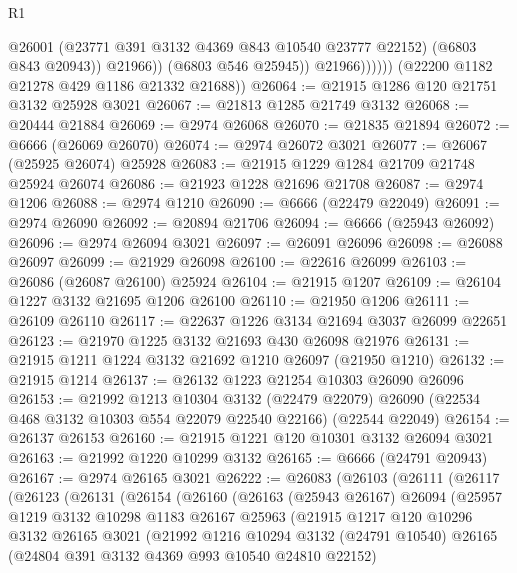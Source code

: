 \begin{lexlean}{R1}
\begin{coremodule}
                          @26001
                          (@23771 @391 @3132 @4369 @843 @10540 @23777 @22152)
                          (@6803 @843 @20943))
                        @21966))
                    (@6803 @546 @25945))
                  @21966))))))
      (@22200 @1182 @21278 @429 @1186 @21332 @21688))
@26064 := @21915 @1286 @120 @21751 @3132 @25928 @3021
@26067 := @21813 @1285 @21749 @3132
@26068 := @20444 @21884
@26069 := @2974 @26068
@26070 := @21835 @21894
@26072 := @6666 (@26069 @26070)
@26074 := @2974 @26072 @3021
@26077 := @26067 (@25925 @26074) @25928
@26083 := @21915 @1229 @1284 @21709 @21748 @25924 @26074
@26086 := @21923 @1228 @21696 @21708
@26087 := @2974 @1206
@26088 := @2974 @1210
@26090 := @6666 (@22479 @22049)
@26091 := @2974 @26090
@26092 := @20894 @21706
@26094 := @6666 (@25943 @26092)
@26096 := @2974 @26094 @3021
@26097 := @26091 @26096
@26098 := @26088 @26097
@26099 := @21929 @26098
@26100 := @22616 @26099
@26103 := @26086 (@26087 @26100) @25924
@26104 := @21915 @1207
@26109 := @26104 @1227 @3132 @21695 @1206 @26100
@26110 := @21950 @1206
@26111 := @26109 @26110
@26117 := @22637 @1226 @3134 @21694 @3037 @26099 @22651
@26123 := @21970 @1225 @3132 @21693 @430 @26098 @21976
@26131 := @21915 @1211 @1224 @3132 @21692 @1210 @26097 (@21950 @1210)
@26132 := @21915 @1214
@26137 := @26132 @1223 @21254 @10303 @26090 @26096
@26153 := @21992
    @1213
    @10304
    @3132
    (@22479 @22079)
    @26090
    (@22534 @468 @3132 @10303 @554 @22079 @22540 @22166)
    (@22544 @22049)
@26154 := @26137 @26153
@26160 := @21915 @1221 @120 @10301 @3132 @26094 @3021
@26163 := @21992 @1220 @10299 @3132
@26165 := @6666 (@24791 @20943)
@26167 := @2974 @26165 @3021
@26222 := @26083
    (@26103
      (@26111
        (@26117
          (@26123
            (@26131
              (@26154
                (@26160
                  (@26163
                    (@25943 @26167)
                    @26094
                    (@25957
                      @1219
                      @3132
                      @10298
                      @1183
                      @26167
                      @25963
                      (@21915
                        @1217
                        @120
                        @10296
                        @3132
                        @26165
                        @3021
                        (@21992
                          @1216
                          @10294
                          @3132
                          (@24791 @10540)
                          @26165
                          (@24804 @391 @3132 @4369 @993 @10540 @24810 @22152)

\end{coremodule}
\end{lexlean}
